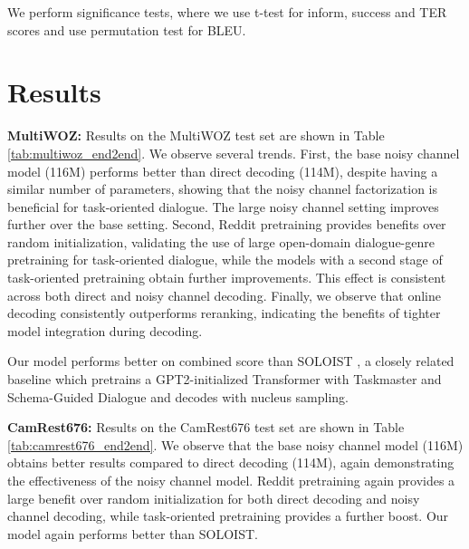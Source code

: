 \documentclass[11pt,a4paper]{article}
\begin{document}
We perform significance tests, where we use t-test for inform, success and TER scores and use permutation test for BLEU. 




\section{Results}
\label{sec:results}









{\bf MultiWOZ:}
Results on the MultiWOZ test set are shown in Table \ref{tab:multiwoz_end2end}. We observe several trends. First, the base noisy channel model (116M) performs  better than direct decoding (114M), despite having a similar number of parameters, showing that the noisy channel factorization is beneficial for task-oriented dialogue. The large noisy channel setting improves further over the base setting. Second, Reddit pretraining provides benefits over random initialization, validating the use of large open-domain dialogue-genre pretraining for task-oriented dialogue, while the models with a second stage of task-oriented pretraining obtain further improvements. This effect is consistent across both direct and noisy channel decoding. Finally, we observe that online decoding consistently outperforms reranking, indicating the benefits of tighter model integration during decoding.



Our model performs better on combined score than SOLOIST \cite{peng2020soloist}, a closely related baseline which pretrains a GPT2-initialized Transformer with Taskmaster and Schema-Guided Dialogue and decodes with nucleus sampling.











{\bf CamRest676:}
Results on the CamRest676 test set are shown in Table \ref{tab:camrest676_end2end}. We observe that the base noisy channel model (116M) obtains better results compared to direct decoding (114M), again demonstrating the effectiveness of the noisy channel model. Reddit pretraining again provides a large benefit over random initialization for both direct decoding and noisy channel decoding, while task-oriented pretraining provides a further boost. Our model again performs better than SOLOIST.
\end{document}
